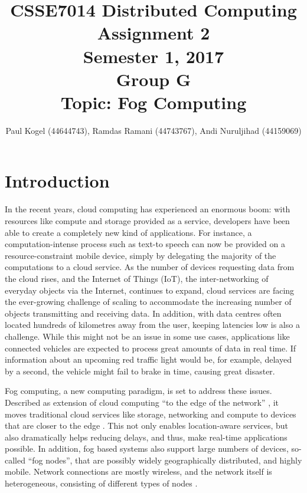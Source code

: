 \documentclass{article}
\title{CSSE7014 Distributed Computing \\
Assignment 2 \\
Semester 1, 2017\\
\vspace{0.5cm}
Group G\\
\vspace{0.5cm}
Topic: Fog Computing}
\author{Paul Kogel (44644743), Ramdas Ramani (44743767), Andi Nuruljihad (44159069)}
\begin{document}
\maketitle

\pagebreak
\tableofcontents\thispagestyle{plain}

\pagebreak

\section{Introduction}

In the recent years, cloud computing has experienced an enormous boom: with resources like compute and storage provided as a service, developers have been able to create a completely new kind of applications. For instance, a computation-intense process such as text-to speech can now be provided on a resource-constraint mobile device, simply by delegating the majority of the computations to a cloud service.
%
As the number of devices requesting data from the cloud rises, and the Internet of Things (IoT), the inter-networking of everyday objects via the Internet, continues to expand, cloud services are facing the ever-growing challenge of scaling to accommodate the increasing number of objects transmitting and receiving data. In addition, with data centres often located hundreds of kilometres away from the user, keeping latencies low is also a challenge. While this might not be an issue in some use cases, applications like connected vehicles are expected to process great amounts of data in real time. If information about an upcoming red traffic light would be, for example, delayed by a second, the vehicle might fail to brake in time, causing great disaster. 

Fog computing, a new computing paradigm, is set to address these issues. Described as extension of cloud computing ``to the edge of the network'' \cite{bonomi2012fog}, it moves traditional cloud services like storage, networking and compute to devices that are closer to the edge \cite{cisco2015fogcomputing}. This not only enables location-aware services, but also dramatically helps reducing delays, and thus, make real-time applications possible. In addition, fog based systems also support large numbers of devices, so-called ``fog nodes'', that are possibly widely geographically distributed, and highly mobile. Network connections are mostly wireless, and the network itself is heterogeneous, consisting of different types of nodes \cite{bonomi2012fog}.
\end{document}
